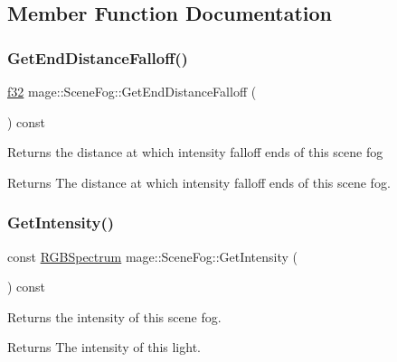\subsection{Member Function Documentation}
\hypertarget{structmage_1_1_scene_fog_adf04c85deb6254e43753d2926fba4189}{}\label{structmage_1_1_scene_fog_adf04c85deb6254e43753d2926fba4189} 
\subsubsection{\texorpdfstring{Get\+End\+Distance\+Falloff()}{GetEndDistanceFalloff()}}
{\footnotesize\ttfamily \hyperlink{namespacemage_a6a44ad388483959dc4dff9f2aef91431}{f32} mage\+::\+Scene\+Fog\+::\+Get\+End\+Distance\+Falloff (\begin{DoxyParamCaption}{ }\end{DoxyParamCaption}) const\hspace{0.3cm}{\ttfamily [noexcept]}}

Returns the distance at which intensity falloff ends of this scene fog

\begin{DoxyReturn}{Returns}
The distance at which intensity falloff ends of this scene fog. 
\end{DoxyReturn}
\hypertarget{structmage_1_1_scene_fog_ac383f82bf8e286ec3478a83fa857f04e}{}\label{structmage_1_1_scene_fog_ac383f82bf8e286ec3478a83fa857f04e} 
\subsubsection{\texorpdfstring{Get\+Intensity()}{GetIntensity()}}
{\footnotesize\ttfamily const \hyperlink{structmage_1_1_r_g_b_spectrum}{R\+G\+B\+Spectrum} mage\+::\+Scene\+Fog\+::\+Get\+Intensity (\begin{DoxyParamCaption}{ }\end{DoxyParamCaption}) const\hspace{0.3cm}{\ttfamily [noexcept]}}

Returns the intensity of this scene fog.

\begin{DoxyReturn}{Returns}
The intensity of this light. 
\end{DoxyReturn}
\hypertarget{structmage_1_1_scene_fog_a9144cd66a763f3017b88a3b6f9658925}{}\label{structmage_1_1_scene_fog_a9144cd66a763f3017b88a3b6f9658925} 
